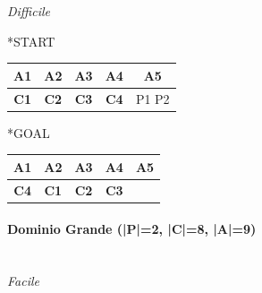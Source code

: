 \documentclass[a4paper,oneside,12pt]{book}
\begin{document}
    \noindent \textit{ \\\\ Difficile\\}
    \begin{minipage}{0.45\textwidth}

        \begin{center}
            *{START}
            \begin{tabular}{|c | c| c | c | c |}
                \hline
                A1&A2&A3&A4&A5\\
                \hline
                \textbf{C1}&\textbf{C2}&\textbf{C3}&\textbf{C4}&P1 P2\\
                \hline
            \end{tabular}

        \end{center}
    \end{minipage}
    \begin{minipage}{0.45\textwidth}

        \begin{center}
            *{GOAL}
            \begin{tabular}{|c | c| c | c | c |}
                \hline
                A1&A2&A3&A4&A5\\
                \hline
                \textbf{C4}&\textbf{C1}&\textbf{C2}&\textbf{C3}&\\
                \hline
            \end{tabular}

        \end{center}
    \end{minipage}


    \paragraph*{Dominio Grande  (|P|=2, |C|=8, |A|=9)\\\\}

    \noindent \textit{Facile}
\end{document}
